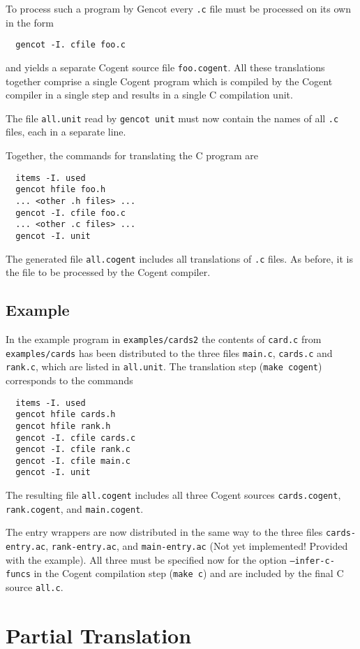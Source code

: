 \documentclass[a4paper]{report}
\newcommand{\code}[1]{\textnormal{\texttt{#1}}}
\begin{document}
To process such a program by Gencot every \code{.c} file must be processed on its own in the form
\begin{verbatim}
  gencot -I. cfile foo.c
\end{verbatim}
and yields a separate Cogent source file \code{foo.cogent}. All these translations together comprise a single
Cogent program which is compiled by the Cogent compiler in a single step and results in a single C compilation unit.

The file \code{all.unit} read by \code{gencot unit} must now contain the names of all \code{.c} files, each in a 
separate line.

Together, the commands for translating the C program are
\begin{verbatim}
  items -I. used
  gencot hfile foo.h
  ... <other .h files> ...
  gencot -I. cfile foo.c
  ... <other .c files> ...
  gencot -I. unit
\end{verbatim}
The generated file \code{all.cogent} includes all translations of \code{.c} files. As before, it is the 
file to be processed by the Cogent compiler.

\subsection{Example}

In the example program in \code{examples/cards2} the contents of \code{card.c} from \code{examples/cards} has been 
distributed to the three files \code{main.c}, \code{cards.c} and \code{rank.c}, which are listed in \code{all.unit}.
The translation step (\code{make cogent}) corresponds to the commands
\begin{verbatim}
  items -I. used
  gencot hfile cards.h
  gencot hfile rank.h
  gencot -I. cfile cards.c
  gencot -I. cfile rank.c
  gencot -I. cfile main.c
  gencot -I. unit
\end{verbatim}
The resulting file \code{all.cogent} includes all three Cogent sources \code{cards.cogent}, \code{rank.cogent}, and
\code{main.cogent}.

The entry wrappers are now distributed in the same way to the three files \code{cards-entry.ac}, \code{rank-entry.ac},
and \code{main-entry.ac} (Not yet implemented! Provided with the example). All three must be specified now for the option
\code{--infer-c-funcs} in the Cogent compilation step (\code{make c}) and are included by the final C source
\code{all.c}.

\section{Partial Translation}
\label{struct-partial}
\end{document}
